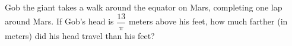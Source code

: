 Gob the giant takes a walk around the equator on Mars, completing one lap around Mars. If Gob's head is $\dfrac{13}{\pi}$ meters above his feet, how much farther (in meters) did his head travel than his feet?
